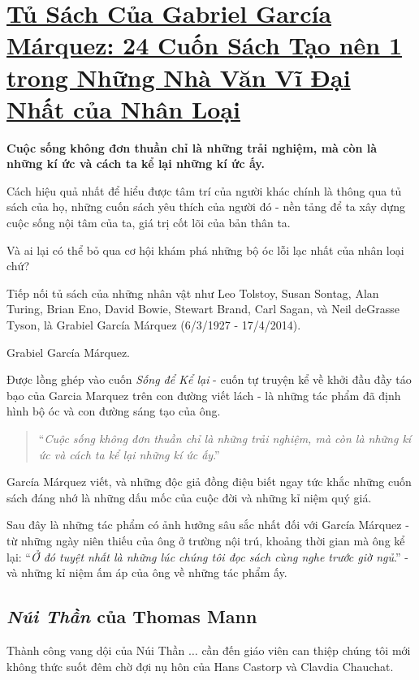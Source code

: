 \documentclass{book}
\numberwithin{equation}{section}
\begin{document}
\chapter{\href{http://tramdoc.vn/tin-tuc/tu-sach-cua-gabriel-garcia-marquez-24-cuon-sach-tao-nen-mot-trong-nhung-nha-van-vi-dai-nhat-cua-nhan-loai-nnOn1W.html}{Tủ Sách Của Gabriel García Márquez: 24 Cuốn Sách Tạo nên 1 trong Những Nhà Văn Vĩ Đại Nhất của Nhân Loại}}

\textbf{Cuộc sống không đơn thuần chỉ là những trải nghiệm, mà còn là những kí ức và cách ta kể lại những kí ức ấy.}

%
Cách hiệu quả nhất để hiểu được tâm trí của người khác chính là thông qua tủ sách của họ, những cuốn sách yêu thích của người đó - nền tảng để ta xây dựng cuộc sống nội tâm của ta, giá trị cốt lõi của bản thân ta.

Và ai lại có thể bỏ qua cơ hội khám phá những bộ óc lỗi lạc nhất của nhân loại chứ?

Tiếp nối tủ sách của những nhân vật như Leo Tolstoy, Susan Sontag, Alan Turing, Brian Eno, David Bowie, Stewart Brand, Carl Sagan, và Neil deGrasse Tyson, là Grabiel García Márquez (6/3/1927 - 17/4/2014).

\textsf{Grabiel García Márquez.}

%
Được lồng ghép vào cuốn \textit{Sống để Kể lại} - cuốn tự truyện kể về khởi đầu đầy táo bạo của Garcia Marquez trên con đường viết lách - là những tác phẩm đã định hình bộ óc và con đường sáng tạo của ông.

\begin{quotation}
    ``\textit{Cuộc sống không đơn thuần chỉ là những trải nghiệm, mà còn là những kí ức và cách ta kể lại những kí ức ấy}.''
\end{quotation}
García Márquez viết, và những độc giả đồng điệu biết ngay tức khắc những cuốn sách đáng nhớ là những dấu mốc của cuộc đời và những kỉ niệm quý giá.

%
Sau đây là những tác phẩm có ảnh hưởng sâu sắc nhất đối với García Márquez - từ những ngày niên thiếu của ông ở trường nội trú, khoảng thời gian mà ông kể lại: ``\textit{Ở đó tuyệt nhất là những lúc chúng tôi đọc sách cùng nghe trước giờ ngủ}.'' - và những kỉ niệm ấm áp của ông về những tác phẩm ấy.

\section{\textit{Núi Thần} của Thomas Mann}
Thành công vang dội của Núi Thần $\ldots$ cần đến giáo viên can thiệp chúng tôi mới không thức suốt đêm chờ đợi nụ hôn của Hans Castorp và Clavdia Chauchat.
\end{document}
